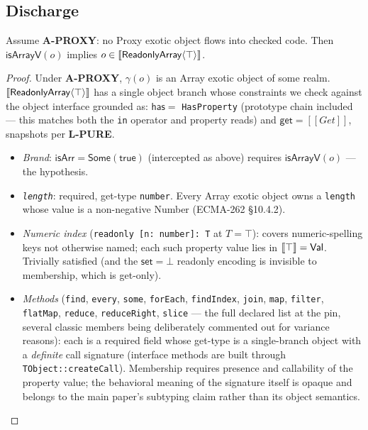 \documentclass[11pt]{article}
\newcommand{\realize}{\gamma}
\newcommand{\ecma}[1]{ECMA-262 \S#1}
\newcommand{\intm}[1]{[[#1]]}
\begin{document}
\subsection{Discharge}

\begin{theorem}
\label{thm:isarr}
Assume \textbf{A-PROXY}: no Proxy exotic object flows into checked code.
Then $\mathsf{isArrayV}(o)$ implies
$o \in \llbracket \mathsf{ReadonlyArray}\langle\top\rangle \rrbracket$.
\end{theorem}
\begin{proof}
Under \textbf{A-PROXY}, $\realize(o)$ is an Array exotic object of some
realm. $\llbracket \mathsf{ReadonlyArray}\langle\top\rangle \rrbracket$ has a single
object branch whose constraints we check against the object interface
grounded as: $\mathsf{has} =$ \texttt{HasProperty} (prototype chain
included — this matches both the \texttt{in} operator and property
reads) and $\mathsf{get} = \intm{Get}$, snapshots per \textbf{L-PURE}.
\begin{itemize}
\item \emph{Brand}: $\mathsf{isArr} = \mathsf{Some}(\mathsf{true})$
  (intercepted as above) requires $\mathsf{isArrayV}(o)$ — the
  hypothesis.
\item \emph{\texttt{length}}: required, get-type \texttt{number}. Every
  Array exotic object owns a \texttt{length} whose value is a
  non-negative Number (\ecma{10.4.2}).
\item \emph{Numeric index} (\texttt{readonly [n: number]:\ T} at
  $T = \top$): covers numeric-spelling keys not otherwise named; each
  such property value lies in $\llbracket \top \rrbracket = \mathsf{Val}$. Trivially satisfied
  (and the $\mathsf{set} = \bot$ readonly encoding is invisible to
  membership, which is get-only).
\item \emph{Methods} (\texttt{find}, \texttt{every}, \texttt{some},
  \texttt{forEach}, \texttt{findIndex}, \texttt{join}, \texttt{map},
  \texttt{filter}, \texttt{flatMap}, \texttt{reduce},
  \texttt{reduceRight}, \texttt{slice} — the full declared list at the
  pin, several classic members being deliberately commented out for
  variance reasons): each is a required field whose get-type is a
  single-branch object with a \emph{definite} call signature
  (interface methods are built through \texttt{TObject::createCall}).
  Membership requires presence and callability of the property value;
  the behavioral meaning of the signature itself is opaque and belongs
  to the main paper's subtyping claim rather than its object semantics.

\end{itemize}
\end{proof}
\end{document}
